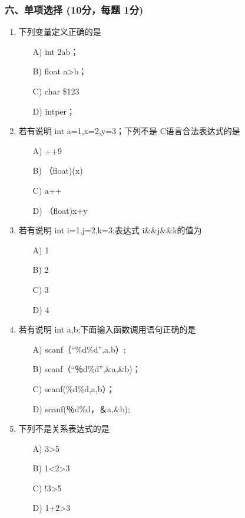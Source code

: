 \documentclass[12pt,a4paper]{article}
\begin{document}
\subsubsection*{六、单项选择 (10分，每题 1分)}
\begin{enumerate}
    \item 下列变量定义正确的是
    \begin{enumerate}
        \item[A)] int 2ab；
        \item[B)] float a>b；
        \item[C)] char \$123
        \item[D)] int\*per；
    \end{enumerate}
    
    \item 若有说明 int a=1,x=2,y=3；下列不是 C语言合法表达式的是
    \begin{enumerate}
        \item[A)] ++9
        \item[B)] （float)(x)
        \item[C)] a++
        \item[D)] （float)x+y
    \end{enumerate}
    
    \item 若有说明 int i=1,j=2,k=3;表达式 i\&\&j\&\&k的值为
    \begin{enumerate}
        \item[A)] 1
        \item[B)] 2
        \item[C)] 3
        \item[D)] 4
    \end{enumerate}
    
    \item 若有说明 int a,b;下面输入函数调用语句正确的是
    \begin{enumerate}
        \item[A)] scanf（“\%d\%d”,a,b）;
        \item[B)] scanf（“％d\%d”,\&a,\&b)；
        \item[C)] scanf(\%d\%d,a,b）；
        \item[D)] scanf(％d\%d，＆a,\&b);
    \end{enumerate}
    
    \item 下列不是关系表达式的是
    \begin{enumerate}
        \item[A)] 3>5
        \item[B)] 1<2>3
        \item[C)] !3>5
        \item[D)] 1+2>3
    \end{enumerate}
    

\end{enumerate}
\end{document}
